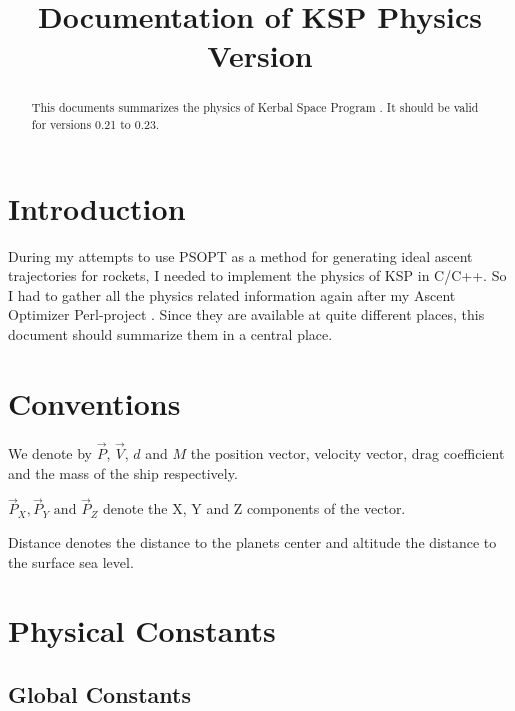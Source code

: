 \documentclass[11pt]{article}
\newcommand{\oa}[1]{\overrightarrow{#1}}
\newcommand{\Pos}{\oa{P}}
\newcommand{\Vel}{\oa{V}}
\begin{document}
\title{Documentation of KSP Physics\\\small{Version }}

\maketitle

\begin{abstract}

  This documents summarizes the physics of Kerbal Space Program \cite{KSP}. It should be valid for versions 0.21 to 0.23.

\end{abstract}

\tableofcontents

\section{Introduction}

During my attempts to use PSOPT as a method for generating ideal
ascent trajectories for rockets, I needed to implement the physics of
KSP in C/C++. So I had to gather all the physics related information
again after my Ascent Optimizer Perl-project \cite{PAO}. Since they
are available at quite different places, this document should
summarize them in a central place.

\section{Conventions}

We denote by $\Pos$, $\Vel$, $d$ and $M$ the position vector, velocity
vector, drag coefficient and the mass of the ship respectively.

$\Pos_X, \Pos_Y \textrm{ and } \Pos_Z$ denote the X, Y and Z
components of the vector.

Distance denotes the distance to the planets center and altitude the
distance to the surface sea level.

\section{Physical Constants}


\subsection{Global Constants}
\end{document}
